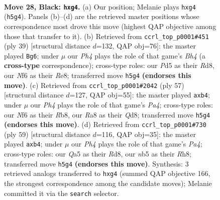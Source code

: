 \documentclass[11pt]{article}
\begin{document}
\clearpage

\begin{figure}[p]\centering
\begin{subfigure}{0.46\textwidth}\centering
\resizebox{\linewidth}{!}{%
\newchessgame
\chessboard[
  setfen={r4k2/Pb2rp2/1pn2n2/qN1p1BNp/P2P2PP/R7/2Q2K2/7R b - - 0 28},
  showmover=false,
  pgfstyle=straightmove, color=movearrow, markmove={h5-g4}
]}
\caption{}
\end{subfigure}\hfill
\begin{subfigure}{0.46\textwidth}\centering
\resizebox{\linewidth}{!}{%
\newchessgame
\chessboard[
  setfen={3rr1k1/ppp2ppp/2n5/P6b/6P1/2PPq2P/R3P1B1/3QNR1K b - - 1 20},
  showmover=false,
  pgfstyle=straightmove, color=movearrow, markmove={h5-g6}
]}
\caption{}
\end{subfigure}
\\[4pt]
\begin{subfigure}{0.46\textwidth}\centering
\resizebox{\linewidth}{!}{%
\newchessgame
\chessboard[
  setfen={1r1q2k1/2r2pp1/2n4p/p2p1b2/1P1Pn3/1Q1BPNP1/2R2PPK/R3B3 b - - 0 29},
  showmover=false,
  pgfstyle=straightmove, color=movearrow, markmove={a5-b4}
]}
\caption{}
\end{subfigure}\hfill
\begin{subfigure}{0.46\textwidth}\centering
\resizebox{\linewidth}{!}{%
\newchessgame
\chessboard[
  setfen={3rk2r/1q2bpp1/4p3/p3nnP1/1P2NN1p/1P3P1P/P2B1Q2/1KRR4 b - - 0 30},
  showmover=false,
  pgfstyle=straightmove, color=movearrow, markmove={a5-b4}
]}
\caption{}
\end{subfigure}
\caption{\textbf{Move 28, Black: \texttt{hxg4}.} (a) Our position; Melanie plays \texttt{hxg4} (\texttt{h5g4}). Panels (b)--(d) are the retrieved master positions whose correspondence most drove this move (highest QAP objective among those that transfer to it). (b) Retrieved from \texttt{ccrl\_top\_p0001\#451} (ply 39) [structural distance $d$=132, QAP obj=76]: the master played \texttt{Bg6}; under $\mu$ our \emph{Ph4} plays the role of that game's \emph{Bh4} (a \textbf{cross-type} correspondence); cross-type roles: our \emph{P}d5 as their \emph{R}d8, our \emph{N}f6 as their \emph{R}e8; transferred move \texttt{h5g4} \textbf{(endorses this move)}. (c) Retrieved from \texttt{ccrl\_top\_p0001\#2042} (ply 57) [structural distance $d$=127, QAP obj=55]: the master played \texttt{axb4}; under $\mu$ our \emph{Ph4} plays the role of that game's \emph{Pa4}; cross-type roles: our \emph{N}f6 as their \emph{R}b8, our \emph{R}a8 as their \emph{Q}d8; transferred move \texttt{h5g4} \textbf{(endorses this move)}. (d) Retrieved from \texttt{ccrl\_top\_p0001\#730} (ply 59) [structural distance $d$=116, QAP obj=35]: the master played \texttt{axb4}; under $\mu$ our \emph{Ph4} plays the role of that game's \emph{Pa4}; cross-type roles: our \emph{Q}a5 as their \emph{R}d8, our \emph{n}b5 as their \emph{R}h8; transferred move \texttt{h5g4} \textbf{(endorses this move)}. Synthesis: 3 retrieved analogs transferred to \texttt{hxg4} (summed QAP objective 166, the strongest correspondence among the candidate moves); Melanie committed it via the \texttt{search} selector.}
\label{fig:thought-m55}
\end{figure}
\end{document}
